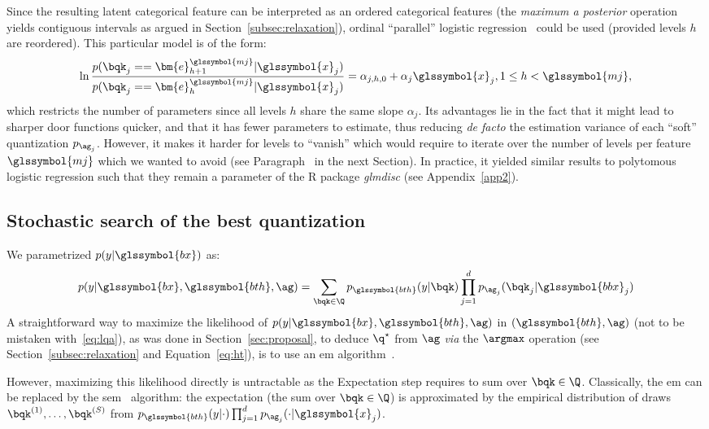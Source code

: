 Since the resulting latent categorical feature can be interpreted as an ordered categorical features (the \textit{maximum a posterior} operation yields contiguous intervals as argued in Section~\ref{subsec:relaxation}), ordinal ``parallel'' logistic regression~\cite{o2006logistic} could be used (provided levels $h$ are reordered). This particular model is of the form:
\[ \ln \frac{p(\bqk_{j} = = \bm{e}_{h+1}^{\glssymbol{mj}} | \glssymbol{x}_j)}{p(\bqk_{j} = = \bm{e}_h^{\glssymbol{mj}} | \glssymbol{x}_j)} = \alpha_{j,h,0} + \alpha_{j} \glssymbol{x}_j, 1 \leq h < \glssymbol{mj}, \]
which restricts the number of parameters since all levels $h$ share the same slope $\alpha_j$. Its advantages lie in the fact that it might lead to sharper door functions quicker, and that it has fewer parameters to estimate, thus reducing \textit{de facto} the estimation variance of each ``soft'' quantization $p_{\ag_j}$. However, it makes it harder for levels to ``vanish'' which would require to iterate over the number of levels per feature $\glssymbol{mj}$ which we wanted to avoid (see Paragraph~ in the next Section). In practice, it yielded similar results to polytomous logistic regression such that they remain a parameter of the \textsf{R} package \textit{glmdisc} (see Appendix~\ref{app2}).

\subsection{Stochastic search of the best quantization} \label{subsec:stoch}

We parametrized $p(y|\glssymbol{bx})$ as:
\begin{equation}
p(y | \glssymbol{bx}, \glssymbol{bth}, \ag) = \sum_{\bqk \in \Q} p_{\glssymbol{bth}}(y | \bqk) \prod_{j=1}^d p_{\ag_j}(\bqk_j | \glssymbol{bbx}_j)
\end{equation}
A straightforward way to maximize the likelihood of $p(y | \glssymbol{bx}, \glssymbol{bth}, \ag)$ in $(\glssymbol{bth}, \ag)$ (not to be mistaken with~\eqref{eq:lqa}), as was done in Section~\ref{sec:proposal}, to deduce $\q^\star$ from $\ag$ \textit{via} the $\argmax$ operation (see Section~\ref{subsec:relaxation} and Equation~\eqref{eq:ht}), is to use an \gls{em} algorithm~\cite{dempster1977maximum}.

However, maximizing this likelihood directly is untractable as the Expectation step requires to sum over $\bqk \in \Q$. Classically, the \gls{em} can be replaced by the \acrlong{sem}~\cite{celeux1985sem} algorithm: the expectation (the sum over $\bqk \in \Q$) is approximated by the empirical distribution of draws $\bqk^{(1)}, \dots, \bqk^{(S)}$ from $p_{\glssymbol{bth}}(y | \cdot) \prod_{j=1}^d p_{\ag_j}(\cdot | \glssymbol{x}_j)$.

